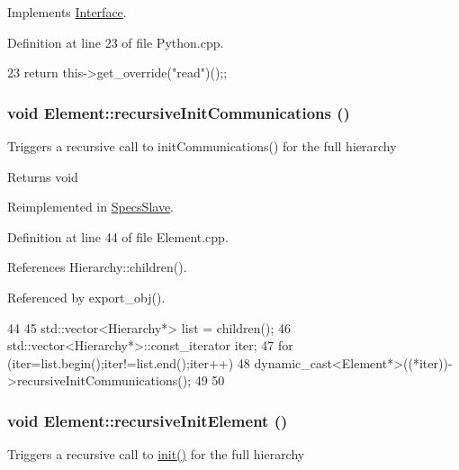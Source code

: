 Implements \hyperlink{classInterface_a99136b67c8e6cbcaa0477c36940ac2ef}{Interface}.

Definition at line 23 of file Python.cpp.


\begin{DoxyCode}
23 {return this->get_override("read")();};
\end{DoxyCode}
\hypertarget{classElement_a82119ed37dff76508a2746a853ec35ba}{
\subsubsection[{recursiveInitCommunications}]{\setlength{\rightskip}{0pt plus 5cm}void Element::recursiveInitCommunications ()}}
\label{classElement_a82119ed37dff76508a2746a853ec35ba}
Triggers a recursive call to initCommunications() for the full hierarchy

\begin{DoxyReturn}{Returns}
void 
\end{DoxyReturn}


Reimplemented in \hyperlink{classSpecsSlave_a347b94c2ba660ccde6927fe72590a1bc}{SpecsSlave}.

Definition at line 44 of file Element.cpp.

References Hierarchy::children().

Referenced by export\_\-obj().


\begin{DoxyCode}
44                                          {
45   std::vector<Hierarchy*> list = children();
46   std::vector<Hierarchy*>::const_iterator iter;
47   for (iter=list.begin();iter!=list.end();iter++){
48     dynamic_cast<Element*>((*iter))->recursiveInitCommunications();
49   }
50 }
\end{DoxyCode}
\hypertarget{classElement_a3c0abcb36f8906688bb7e32608df7086}{
\subsubsection[{recursiveInitElement}]{\setlength{\rightskip}{0pt plus 5cm}void Element::recursiveInitElement ()}}
\label{classElement_a3c0abcb36f8906688bb7e32608df7086}
Triggers a recursive call to \hyperlink{classElement_af42754b5cabc198869222725218d695c}{init()} for the full hierarchy

